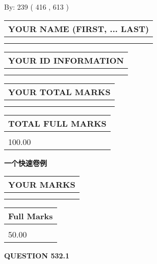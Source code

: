 \documentclass{ctexart}
\begin{document}
   
\hspace{1.0in} By: 
 239 ( 416 ,  613 )
   
   
   
   
\newpage 
\setcounter{page}{ 
   532001 } 
   
   
   
   
\noindent\begin{tabular}{|l|}
\hline
YOUR NAME (FIRST, ... LAST)  \\
\hline
 \\ 
 \\ 
\hline
\end{tabular}
\hspace{0.05in} \begin{tabular}{|l|}
\hline
 YOUR   ID   INFORMATION  \\
\hline
 \\ 
 \\ 
\hline
\end{tabular}
   
   
\vspace{0.2in}\noindent\begin{tabular}{|l|}
\hline
YOUR TOTAL MARKS  \\
\hline
 \\ 
 \\ 
\hline
\end{tabular}
\hspace{0.05in} \begin{tabular}{|l|}
\hline
TOTAL FULL MARKS  \\
\hline
 \\ 
100.00 \\
\hline
\end{tabular}
   
   
 \vspace{0.2in}
{\LARGE {\textbf{ 一个快速卷例}}}
   
   
  
\vspace{0.2in}
  
\noindent\begin{tabular}{|l|}
\hline
 YOUR MARKS  \\
\hline
 \\ 
 \\ 
\hline
\end{tabular}
\hspace{0.05in} \begin{tabular}{|l|}
\hline
 Full Marks  \\
\hline
 \\ 
50.00 \\
\hline
\end{tabular}
{\textbf{\Large{QUESTION
532.1 
}}}
  
\end{document}
